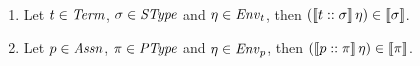\documentclass[12pt,a4paper]{report}
\begin{document}
\begin{lemma} \
  \begin{enumerate}
    \item Let $t \in\mathit{Term}$, $\sigma\in\mathit{SType}$ and $\eta\in\mathit{Env}_t$, then
          $(\llbracket t\mathrel{::}\sigma\rrbracket\,\eta) \in \llbracket\sigma\rrbracket$.
    \item Let $p \in\mathit{Assn}$, $\pi\in\mathit{PType}$ and $\eta\in\mathit{Env}_p$, then
          $(\llbracket p\mathrel{::}\pi\rrbracket\,\eta) \in \llbracket\pi\rrbracket$.
  \end{enumerate}
\end{lemma}
\end{document}
